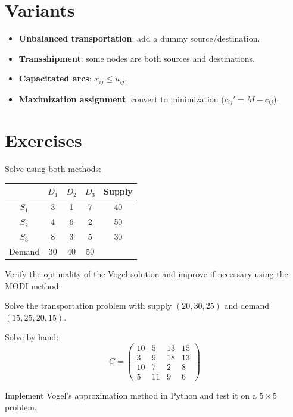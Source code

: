 \section{Variants}

\begin{itemize}
  \item \textbf{Unbalanced transportation}: add a dummy source/destination.
  \item \textbf{Transshipment}: some nodes are both sources and destinations.
  \item \textbf{Capacitated arcs}: $x_{ij} \le u_{ij}$.
  \item \textbf{Maximization assignment}: convert to minimization
        ($c_{ij}' = M - c_{ij}$).
\end{itemize}

\section{Exercises}

\begin{exercise}
Solve using both methods:
\begin{center}
\begin{tabular}{c|ccc|c}
  & $D_1$ & $D_2$ & $D_3$ & Supply \\
  \hline
  $S_1$ & 3 & 1 & 7 & 40 \\
  $S_2$ & 4 & 6 & 2 & 50 \\
  $S_3$ & 8 & 3 & 5 & 30 \\
  \hline
  Demand & 30 & 40 & 50 & \\
\end{tabular}
\end{center}
\end{exercise}

\begin{exercise}
Verify the optimality of the Vogel solution and improve if necessary using
the MODI method.
\end{exercise}

\begin{exercise}
Solve the transportation problem with supply $(20, 30, 25)$ and demand
$(15, 25, 20, 15)$.
\end{exercise}

\begin{exercise}
Solve by hand:
\[
C = \begin{pmatrix}
  10 & 5 & 13 & 15 \\
  3 & 9 & 18 & 13 \\
  10 & 7 & 2 & 8 \\
  5 & 11 & 9 & 6
\end{pmatrix}
\]
\end{exercise}

\begin{exercise}
Implement Vogel's approximation method in Python and test it on a
$5 \times 5$ problem.
\end{exercise}
